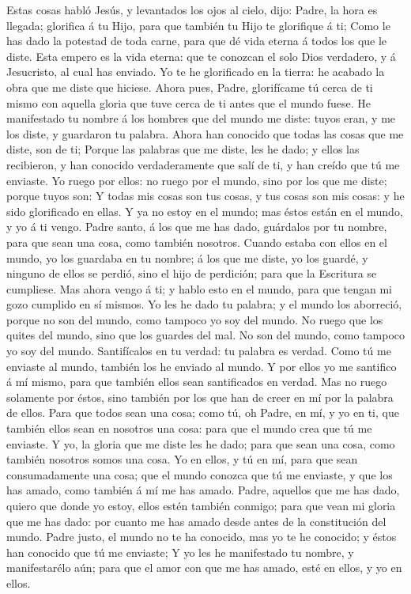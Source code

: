  Estas cosas habló Jesús, y levantados los ojos al cielo,
dijo: Padre, la hora es llegada; glorifica á tu Hijo, para que también
tu Hijo te glorifique á ti;  Como le has dado la potestad de
toda carne, para que dé vida eterna á todos los que le diste.
 Esta empero es la vida eterna: que te conozcan el solo Dios
verdadero, y á Jesucristo, al cual has enviado.  Yo te he
glorificado en la tierra: he acabado la obra que me diste que hiciese.
 Ahora pues, Padre, glorifícame tú cerca de ti mismo con
aquella gloria que tuve cerca de ti antes que el mundo fuese.
 He manifestado tu nombre á los hombres que del mundo me
diste: tuyos eran, y me los diste, y guardaron tu palabra. 
Ahora han conocido que todas las cosas que me diste, son de ti;
 Porque las palabras que me diste, les he dado; y ellos las
recibieron, y han conocido verdaderamente que salí de ti, y han creído
que tú me enviaste.  Yo ruego por ellos: no ruego por el
mundo, sino por los que me diste; porque tuyos son:  Y
todas mis cosas son tus cosas, y tus cosas son mis cosas: y he sido
glorificado en ellas.  Y ya no estoy en el mundo; mas éstos
están en el mundo, y yo á ti vengo. Padre santo, á los que me has dado,
guárdalos por tu nombre, para que sean una cosa, como también nosotros.
 Cuando estaba con ellos en el mundo, yo los guardaba en tu
nombre; á los que me diste, yo los guardé, y ninguno de ellos se perdió,
sino el hijo de perdición; para que la Escritura se cumpliese.
 Mas ahora vengo á ti; y hablo esto en el mundo, para que
tengan mi gozo cumplido en sí mismos.  Yo les he dado tu
palabra; y el mundo los aborreció, porque no son del mundo, como tampoco
yo soy del mundo.  No ruego que los quites del mundo, sino
que los guardes del mal.  No son del mundo, como tampoco yo
soy del mundo.  Santifícalos en tu verdad: tu palabra es
verdad.  Como tú me enviaste al mundo, también los he
enviado al mundo.  Y por ellos yo me santifico á mí mismo,
para que también ellos sean santificados en verdad.  Mas no
ruego solamente por éstos, sino también por los que han de creer en mí
por la palabra de ellos.  Para que todos sean una cosa;
como tú, oh Padre, en mí, y yo en ti, que también ellos sean en nosotros
una cosa: para que el mundo crea que tú me enviaste.  Y yo,
la gloria que me diste les he dado; para que sean una cosa, como también
nosotros somos una cosa.  Yo en ellos, y tú en mí, para que
sean consumadamente una cosa; que el mundo conozca que tú me enviaste, y
que los has amado, como también á mí me has amado.  Padre,
aquellos que me has dado, quiero que donde yo estoy, ellos estén también
conmigo; para que vean mi gloria que me has dado: por cuanto me has
amado desde antes de la constitución del mundo.  Padre
justo, el mundo no te ha conocido, mas yo te he conocido; y éstos han
conocido que tú me enviaste;  Y yo les he manifestado tu
nombre, y manifestarélo aún; para que el amor con que me has amado, esté
en ellos, y yo en ellos.

